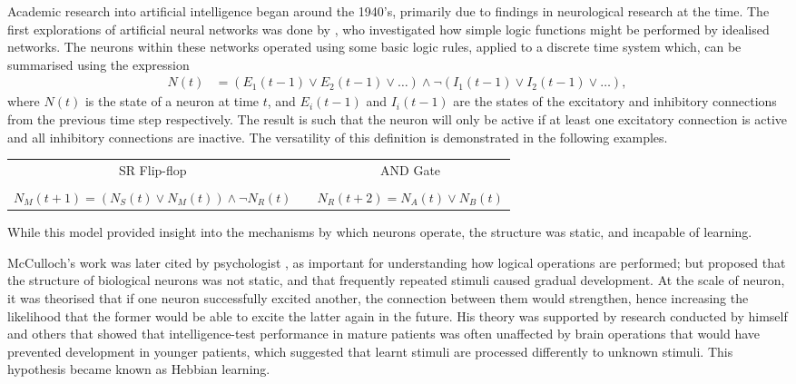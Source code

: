 Academic research into artificial intelligence began around the 1940's,
primarily due to findings in neurological research at the time.
The first explorations of artificial neural networks was done by
\cite{McCulloch:1943:Logical}, who investigated how simple logic functions
might be performed by idealised networks.
The neurons within these networks operated using some basic logic rules, applied
to a discrete time system which, can be summarised using the expression
\begin{align*}
    N(t) &= (E_1(t-1) \vee E_2(t-1) \vee \dots)
        \wedge \neg(I_1(t-1) \vee I_2(t-1) \vee \dots),
\end{align*}
where $N(t)$ is the state of a neuron at time $t$, and $E_i(t-1)$ and $I_i(t-1)$
are the states of the excitatory and inhibitory connections from the previous
time step respectively.
The result is such that the neuron will only be active if at least one
excitatory connection is active and all inhibitory connections are inactive.
The versatility of this definition is demonstrated in the following examples.
\begin{center}
    \begin{tabular}{ccc}
        SR Flip-flop & & AND Gate\\
         & & \\
        $\displaystyle N_M(t+1) = (N_S(t) \vee N_M(t)) \wedge\neg N_R(t)$ &
        &
        $\displaystyle N_R(t+2) = N_A(t) \vee N_B(t)$\\
    \end{tabular}
    \parbox{0.9\textwidth}{%
    }
\end{center}
While this model provided insight into the mechanisms by which neurons operate,
the structure was static, and incapable of learning.



McCulloch's work was later cited by psychologist \cite{Hebb:1949:Organization},
as important for understanding how logical operations are performed; but
proposed that the structure of biological neurons was not static, and that
frequently repeated stimuli caused gradual development.
At the scale of neuron, it was theorised that if one neuron successfully
excited another, the connection between them would strengthen, hence
increasing the likelihood that the former would be able to excite the latter
again in the future.
His theory was supported by research conducted by himself and others that showed
that intelligence-test performance in mature patients was often unaffected by
brain operations that would have prevented development in younger patients,
which suggested that learnt stimuli are processed differently to unknown
stimuli.
This hypothesis became known as Hebbian learning.



